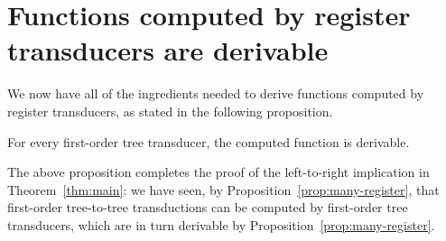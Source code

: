 
\section{Functions computed by register transducers are derivable}
\label{sec:stt-derivable}
We now  have all of the ingredients needed to derive functions computed by register transducers, as stated in the following proposition.
\begin{proposition}
    \label{prop:many-register} 
For every first-order  tree transducer, the computed function is derivable. 
\end{proposition}
The above proposition  completes the proof of the left-to-right implication in Theorem~\ref{thm:main}: we have seen, by Proposition~\ref{prop:many-register}, that first-order tree-to-tree transductions can be computed by first-order tree transducers, which are in turn derivable by Proposition~\ref{prop:many-register}.

